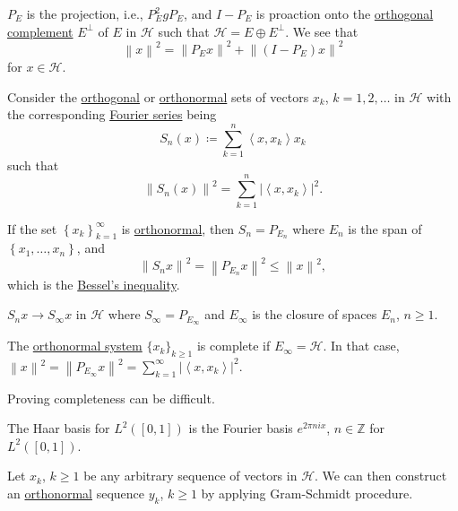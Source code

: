 \begin{remark}
	\(P_E\) is the projection, i.e., \(P_E ^{2} g P_E\), and \(I-P_E\) is proaction onto the \hyperref[def:orthogonal-complement]{orthogonal complement} \(E^\perp\) of \(E\) in \(\mathcal{H} \) such that \(\mathcal{H} = E \oplus E^{\perp} \). We see that
	\[
		\left\lVert x\right\rVert ^{2} = \left\lVert P_E x\right\rVert ^{2} + \left\lVert (I - P_E)x\right\rVert ^{2}
	\]
	for \(x\in \mathcal{H} \).
\end{remark}

Consider the \hyperref[def:orthogonal-system]{orthogonal} or \hyperref[def:orthonormal-system]{orthonormal} sets of vectors \(x_k\), \(k = 1, 2, \dots  \) in \(\mathcal{H} \) with the corresponding \hyperref[def:Fourier-series]{Fourier series} being
\[
	S_n(x) \coloneqq \sum_{k=1} ^n \left\langle x, x_k \right\rangle x_k
\]
such that
\[
	\left\lVert S_n(x)\right\rVert ^{2} = \sum_{k=1}^n \left\vert \left\langle x, x_k \right\rangle  \right\vert ^{2}.
\]

If the set \(\left\{ x_k \right\} _{k=1}^{\infty} \) is \hyperref[def:orthonormal-system]{orthonormal}, then \(S_n = P_{E_n}\) where \(E_n\) is the span of \(\left\{ x_1, \dots , x_n  \right\} \), and
\[
	\left\lVert S_n x\right\rVert ^{2} = \left\lVert P_{E_n}x\right\rVert ^{2} \leq \left\lVert x\right\rVert ^{2},
\]
which is the \hyperref[thm:Bessel-ineq]{Bessel's inequality}.

\begin{remark}
	\(S_n x \to S_\infty x\) in \(\mathcal{H} \) where \(S_\infty = P_{E_\infty }\) and \(E_\infty \) is the closure of spaces \(E_n\), \(n \geq 1\).
\end{remark}

The \hyperref[def:orthonormal-system]{orthonormal system} \(\{x_k\}_{k \geq 1}\) is complete if \(E_\infty = \mathcal{H}\). In that case, \(\left\lVert x\right\rVert ^{2} = \left\lVert P_{E_\infty }x\right\rVert ^{2} = \sum_{k=1}^{\infty} \left\vert \left\langle x, x_k \right\rangle  \right\vert ^{2} \).

\begin{remark}
	Proving completeness can be difficult.
\end{remark}

\begin{eg}
	The Haar basis for \(L^2([0, 1])\) is the Fourier basis \(e^{2\pi ni x}\), \(n \in \mathbb{Z } \) for \(L^2([0, 1])\).
\end{eg}
\begin{explanation}
	Let \(x_k\), \(k \geq 1\) be any arbitrary sequence of vectors in \(\mathcal{H} \). We can then construct an \hyperref[def:orthonormal-system]{orthonormal} sequence \(y_k\), \(k \geq 1\) by applying Gram-Schmidt procedure.
\end{explanation}

